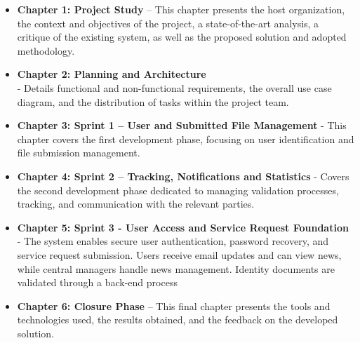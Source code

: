 \begin{itemize}
    \item \textbf{Chapter 1: Project Study} – This chapter presents the host organization, the context and objectives of the project, a state-of-the-art analysis, a critique of the existing system, as well as the proposed solution and adopted methodology.
    \item \textbf{Chapter 2: Planning and Architecture}\\ - Details functional and non-functional requirements, the overall use case diagram, and the distribution of tasks within the project team.
    \item \textbf{Chapter 3: Sprint 1 – User and Submitted File Management} - 
  This chapter covers the first development phase, focusing on user identification and file submission management.
    \item \textbf{Chapter 4: Sprint 2 – Tracking, Notifications and Statistics} - Covers the second development phase dedicated to managing validation processes, tracking, and communication with the relevant parties.
    \item \textbf{Chapter 5: Sprint 3 - User Access and Service Request Foundation} - The system enables secure user authentication, password recovery, and service request submission. Users receive email updates and can view news, while central managers handle news management. Identity documents are validated through a back-end process
    \item \textbf{Chapter 6: Closure Phase}  –  This final chapter presents the tools and technologies used, the results obtained, and the feedback on the developed solution.
\end{itemize}